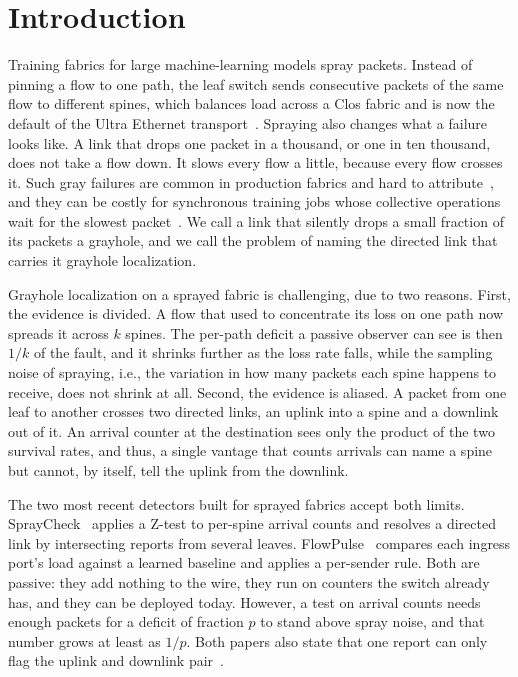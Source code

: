 \section{Introduction}
\label{sec:intro}

Training fabrics for large machine-learning models spray packets. Instead of pinning a flow to one path, the leaf switch sends consecutive packets of the same flow to different spines, which balances load across a Clos fabric and is now the default of the Ultra Ethernet transport~\cite{spraying,uec,reps}. Spraying also changes what a failure looks like. A link that drops one packet in a thousand, or one in ten thousand, does not take a flow down. It slows every flow a little, because every flow crosses it. Such gray failures are common in production fabrics and hard to attribute~\cite{grayfailure,corropt}, and they can be costly for synchronous training jobs whose collective operations wait for the slowest packet~\cite{aegis}. We call a link that silently drops a small fraction of its packets a grayhole, and we call the problem of naming the directed link that carries it grayhole localization.

Grayhole localization on a sprayed fabric is challenging, due to two reasons. First, the evidence is divided. A flow that used to concentrate its loss on one path now spreads it across $k$ spines. The per-path deficit a passive observer can see is then $1/k$ of the fault, and it shrinks further as the loss rate falls, while the sampling noise of spraying, i.e., the variation in how many packets each spine happens to receive, does not shrink at all. Second, the evidence is aliased. A packet from one leaf to another crosses two directed links, an uplink into a spine and a downlink out of it. An arrival counter at the destination sees only the product of the two survival rates, and thus, a single vantage that counts arrivals can name a spine but cannot, by itself, tell the uplink from the downlink.

The two most recent detectors built for sprayed fabrics accept both limits. SprayCheck~\cite{spraycheck} applies a Z-test to per-spine arrival counts and resolves a directed link by intersecting reports from several leaves. FlowPulse~\cite{flowpulse} compares each ingress port's load against a learned baseline and applies a per-sender rule. Both are passive: they add nothing to the wire, they run on counters the switch already has, and they can be deployed today. However, a test on arrival counts needs enough packets for a deficit of fraction $p$ to stand above spray noise, and that number grows at least as $1/p$. Both papers also state that one report can only flag the uplink and downlink pair~\cite{spraycheck,flowpulse}.

